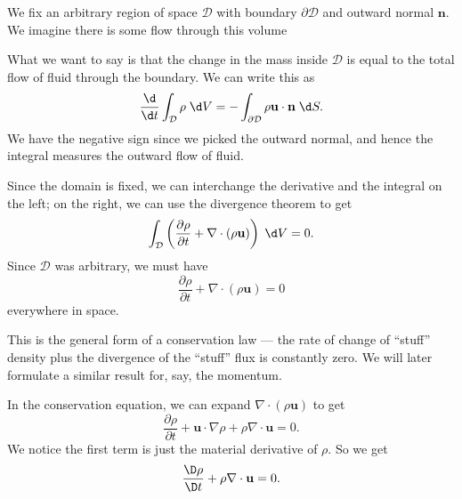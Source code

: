 \documentclass[a4paper]{article}
\begin{document}
We fix an arbitrary region of space $\mathcal{D}$ with boundary $\partial \mathcal{D}$ and outward normal $\mathbf{n}$. We imagine there is some flow through this volume
\begin{center}
\end{center}
What we want to say is that the change in the mass inside $\mathcal{D}$ is equal to the total flow of fluid through the boundary. We can write this as
\[
  \frac{\d }{\d t}\int_{\mathcal{D}} \rho \;\d V = -\int_{\partial \mathcal{D}} \rho \mathbf{u}\cdot \mathbf{n}\;\d S.
\]
We have the negative sign since we picked the outward normal, and hence the integral measures the outward flow of fluid.

Since the domain is fixed, we can interchange the derivative and the integral on the left; on the right, we can use the divergence theorem to get
\[
  \int_{\mathcal{D}} \left(\frac{\partial \rho}{\partial t} + \nabla \cdot (\rho \mathbf{u})\right) \;\d V = 0.
\]
Since $\mathcal{D}$ was arbitrary, we must have
\[
  \frac{\partial \rho}{\partial t} + \nabla \cdot (\rho \mathbf{u}) = 0
\]
everywhere in space.

This is the general form of a conservation law --- the rate of change of ``stuff'' density plus the divergence of the ``stuff'' flux is constantly zero. We will later formulate a similar result for, say, the momentum.

In the conservation equation, we can expand $\nabla \cdot (\rho \mathbf{u})$ to get
\[
  \frac{\partial \rho}{\partial t} + \mathbf{u}\cdot \nabla \rho + \rho \nabla \cdot \mathbf{u} = 0.
\]
We notice the first term is just the material derivative of $\rho$. So we get
\[
  \frac{\D \rho}{\D t} + \rho \nabla \cdot \mathbf{u} = 0.
\]
\end{document}
